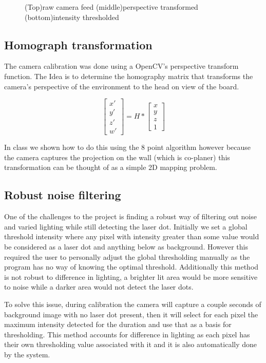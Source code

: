\documentclass[a4paper]{article}
\begin{document}
\begin{figure}
	\caption{(Top)raw camera feed (middle)perspective transformed (bottom)intensity thresholded}
	\label{fig:3stage}
\end{figure}

\subsection{Homograph transformation}
The camera calibration was done using a OpenCV's perspective transform function. The Idea is to determine the homography matrix that transforms the camera's perspective of the environment to the head on view of the board. 

\begin{equation}
\begin{bmatrix}
x' \\ y' \\ z'\\ w'
\end{bmatrix} = H * \begin{bmatrix}
 x \\ y \\ z \\ 1
\end{bmatrix}
\end{equation}

In class we shown how to do this using the 8 point algorithm \cite{hartley1997defense} however because the camera captures the projection on the wall (which is co-planer) this transformation can be thought of as a simple 2D mapping problem. 

\subsection{Robust noise filtering}
One of the challenges to the project is finding a robust way of filtering out noise and varied lighting while still detecting the laser dot. Initially we set a global threshold intensity where any pixel with intensity greater than some value would be considered as a laser dot and anything below as background. However this required the user to personally adjust the global thresholding manually as the program has no way of knowing the optimal threshold. Additionally this method is not robust to difference in lighting, a brighter lit area would be more sensitive to noise while a darker area would not detect the laser dots. 

To solve this issue, during calibration the camera will capture a couple seconds of background image with no laser dot present, then it will select for each pixel the maximum intensity detected for the duration and use that as a basis for thresholding. This method accounts for difference in lighting as each pixel has their own thresholding value associated with it and it is also automatically done by the system.
\end{document}
